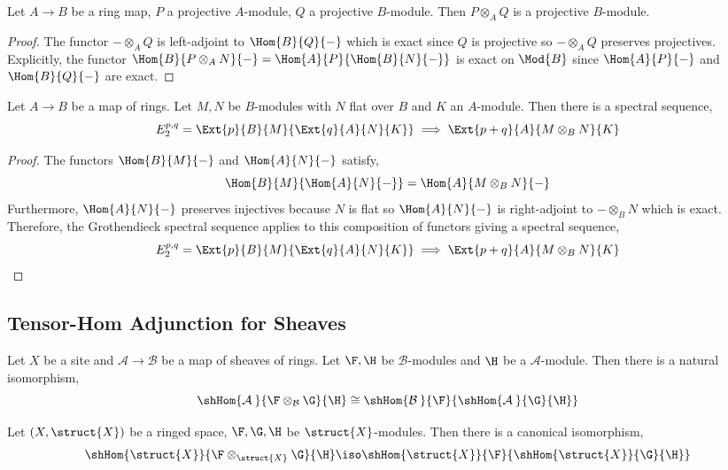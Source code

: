\documentclass[12pt]{article}
\begin{document}
\begin{cor}
Let $A \to B$ be a ring map, $P$ a projective $A$-module, $Q$ a projective $B$-module. Then $P \otimes_A Q$ is a projective $B$-module.
\end{cor}

\begin{proof}
The functor $- \otimes_A Q$ is left-adjoint to $\Hom{B}{Q}{-}$ which is exact since $Q$ is projective so $- \otimes_A Q$ preserves projectives. Explicitly, the functor $\Hom{B}{P \otimes_A N}{-} = \Hom{A}{P}{\Hom{B}{N}{-}}$ is exact on $\Mod{B}$ since $\Hom{A}{P}{-}$ and $\Hom{B}{Q}{-}$ are exact.
\end{proof}

\begin{theorem}
Let $A \to B$ be a map of rings. Let $M, N$ be $B$-modules with $N$ flat over $B$ and $K$ an $A$-module. Then there is a spectral sequence,
\[ E^{p,q}_2 = \Ext{p}{B}{M}{\Ext{q}{A}{N}{K}} \implies \Ext{p+q}{A}{M \otimes_B N}{K} \]
\end{theorem}

\begin{proof}
The functors $\Hom{B}{M}{-}$ and $\Hom{A}{N}{-}$ satisfy,
\[ \Hom{B}{M}{\Hom{A}{N}{-}} = \Hom{A}{M \otimes_B N}{-} \]
Furthermore, $\Hom{A}{N}{-}$ preserves injectives because $N$ is flat so $\Hom{A}{N}{-}$ is right-adjoint to $- \otimes_B N$ which is exact. Therefore, the Grothendieck spectral sequence applies to this composition of functors giving a spectral sequence,
\[ E^{p,q}_2 = \Ext{p}{B}{M}{\Ext{q}{A}{N}{K}} \implies \Ext{p+q}{A}{M \otimes_B N}{K} \]
\end{proof}

\subsection{Tensor-Hom Adjunction for Sheaves}

\newcommand{\sA}{\mathcal{A}}
\newcommand{\sB}{\mathcal{B}}

\begin{prop} \label{tensor_hom_adjunction_sites}
Let $X$ be a site and $\sA \to \sB$ be a map of sheaves of rings. Let $\F, \H$ be $\sB$-modules and $\H$ be a $\sA$-module. Then there is a natural isomorphism,
\[ \shHom{\sA \:}{\F \otimes_{\sB} \G}{\H} \cong \shHom{\sB \:}{\F}{\shHom{\sA \:}{\G}{\H}} \]
\end{prop}

\begin{prop}
Let $(X, \struct{X})$ be a ringed space, $\F, \G, \H$ be $\struct{X}$-modules. Then there is a canonical isomorphism,
\[ \shHom{\struct{X}}{\F \otimes_{\struct{X}} \G}{\H} \iso \shHom{\struct{X}}{\F}{\shHom{\struct{X}}{\G}{\H}} \]
\end{prop}
\end{document}
